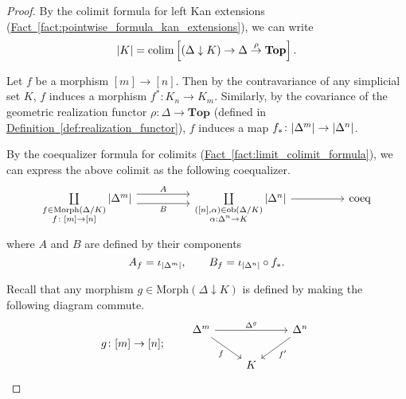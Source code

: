 \documentclass[main.tex]{subfiles}
\begin{document}
\begin{proof}
  By the colimit formula for left Kan extensions (\hyperref[fact:pointwise_formula_kan_extensions]{Fact~\ref*{fact:pointwise_formula_kan_extensions}}), we can write
  \begin{equation*}
    {| K |} = \operatorname*{colim}\left[ (\Delta \downarrow K) \to \Delta \overset{\rho}{\to} \mathbf{Top} \right].
  \end{equation*}

  Let $f$ be a morphism $[m] \to [n]$. Then by the contravariance of any simplicial set $K$, $f$ induces a morphism $f^{*}\colon K_{n} \to K_{m}$. Similarly, by the covariance of  the geometric realization functor $\rho\colon \Delta \to \mathbf{Top}$ (defined in \hyperref[def:realization_functor]{Definition~\ref*{def:realization_functor}}), $f$ induces a map $f_{*}\colon {| \Delta^{m} |} \to {| \Delta^{n} |}$.
  
  By the coequalizer formula for colimits (\hyperref[fact:limit_colimit_formula]{Fact~\ref*{fact:limit_colimit_formula}}), we can express the above colimit as the following coequalizer.
  \begin{equation*}
    \begin{tikzcd}[row sep=huge, column sep=huge]
      \coprod\limits_{\substack{f \in \mathrm{Morph}(\Delta/K) \\ f\colon [m] \to [n]}} \abs{\Delta^{m}}
      \arrow[r, shift left=1.75, "A"]
      \arrow[r, swap, shift right=1.75, "B"]
      &
      \coprod\limits_{\substack{([n], \alpha) \in \ob(\Delta/K) \\ \alpha: \Delta^{n} \to K}} \abs{\Delta^{n}}
      \arrow[r]
      & \mathrm{coeq}
    \end{tikzcd}
  \end{equation*}
  where $A$ and $B$ are defined by their components
  \begin{equation*}
    A_{f} = \iota_{{| \Delta^{m} |}},\qquad B_{f} = \iota_{{| \Delta^{n} |}} \circ  f_{*}.
  \end{equation*}
  
  Recall that any morphism $g \in \mathrm{Morph}(\Delta\downarrow K)$ is defined by making the following diagram commute.
  \begin{equation*}
    g\colon [m] \to [n];\qquad
    \begin{tikzcd}
      \Delta^{m}
      \arrow[rr, "\Delta^{g}"]
      \arrow[rd, swap, "f"]
      && \Delta^{n}
      \arrow[ld, "f'"]
      \\
      & K
    \end{tikzcd}
  \end{equation*}
  

\end{proof}
\end{document}
